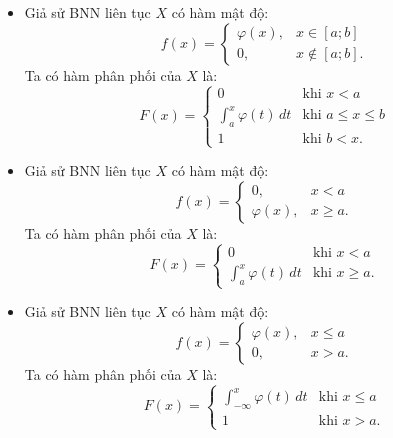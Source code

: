 \documentclass[12pt,a4paper]{article}
\theoremstyle{definition}
\begin{document}
\begin{itemize}
    \item Giả sử BNN liên tục $X$ có hàm mật độ:
    \[
    f(x) = \begin{cases}
    \varphi(x), & x \in [a; b] \\
    0, & x \notin [a; b].
    \end{cases}
    \]
    Ta có hàm phân phối của $X$ là:
    \[
    F(x) = \begin{cases}
    0 & \text{khi } x < a \\
    \displaystyle\int_a^x \varphi(t)\,dt & \text{khi } a \le x \le b \\
    1 & \text{khi } b < x.
    \end{cases}
    \]

    \item Giả sử BNN liên tục $X$ có hàm mật độ:
    \[
    f(x) = \begin{cases}
    0, & x < a \\
    \varphi(x), & x \ge a.
    \end{cases}
    \]
    Ta có hàm phân phối của $X$ là:
    \[
    F(x) = \begin{cases}
    0 & \text{khi } x < a \\
    \displaystyle\int_a^x \varphi(t)\,dt & \text{khi } x \ge a.
    \end{cases}
    \]

    \item Giả sử BNN liên tục $X$ có hàm mật độ:
    \[
    f(x) = \begin{cases}
    \varphi(x), & x \le a \\
    0, & x > a.
    \end{cases}
    \]
    Ta có hàm phân phối của $X$ là:
    \[
    F(x) = \begin{cases}
    \displaystyle\int_{-\infty}^x \varphi(t)\,dt & \text{khi } x \le a \\
    1 & \text{khi } x > a.
    \end{cases}
    \]
\end{itemize}
\end{document}
